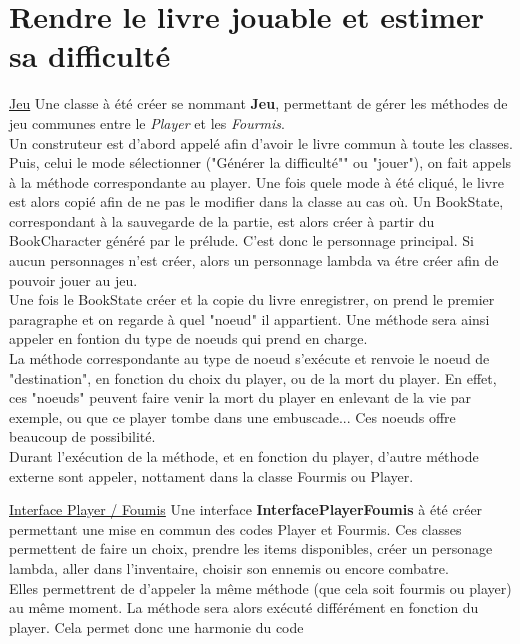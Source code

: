 	\section{Rendre le livre jouable et estimer sa difficulté}
		\underline{Jeu}
		Une classe à été créer se nommant \textbf{Jeu}, permettant de gérer les méthodes de jeu communes entre le \textit{Player} et les \textit{Fourmis}.\\
		Un construteur est d'abord appelé afin d'avoir le livre commun à toute les classes. Puis, celui le mode sélectionner ("Générer la difficulté"" ou "jouer"), on fait appels à la méthode correspondante au player. Une fois quele mode à été cliqué, le livre est alors copié afin de ne pas le modifier dans la classe au cas où. Un BookState, correspondant à la sauvegarde de la partie, est alors créer à partir du BookCharacter généré par le prélude. C'est donc le personnage principal. Si aucun personnages n'est créer, alors un personnage lambda va étre créer afin de pouvoir jouer au jeu.\\
		Une fois le BookState créer et la copie du livre enregistrer, on prend le premier paragraphe et on regarde à quel "noeud" il appartient. Une méthode sera ainsi appeler en fontion du type de noeuds qui prend en charge.\\
		La méthode correspondante au type de noeud s'exécute et renvoie le noeud de "destination", en fonction du choix du player, ou de la mort du player. En effet, ces "noeuds" peuvent faire venir la mort du player en enlevant de la vie par exemple, ou que ce player tombe dans une embuscade... Ces noeuds offre beaucoup de possibilité.\\

		Durant l'exécution de la méthode, et en fonction du player, d'autre méthode externe sont appeler, nottament dans la classe Fourmis ou Player.

	\underline{Interface Player / Foumis}
		Une interface \textbf{InterfacePlayerFoumis} à été créer permettant une mise en commun des codes Player et Fourmis. Ces classes permettent de faire un choix, prendre les items disponibles, créer un personage lambda, aller dans l'inventaire, choisir son ennemis ou encore combatre.\\
		Elles permettrent de d'appeler la même méthode (que cela soit fourmis ou player) au même moment. La méthode sera alors exécuté différément en fonction du player. Cela permet donc une harmonie du code

